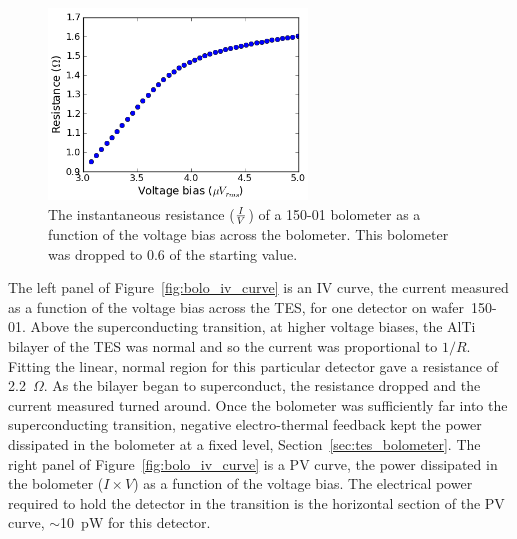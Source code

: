 \begin{figure}[htbp]
\begin{center}
\includegraphics[height=2in]{figures/b53w0c0_RV.png} 
\caption{The instantaneous resistance ($I \over V$) of a 150-01 bolometer as a function of the voltage bias across the bolometer. This bolometer was dropped to 0.6 of the starting value. 
\label{fig:bolo_rv_curve} }
\end{center}
\end{figure}


The left panel of Figure~\ref{fig:bolo_iv_curve} is an IV curve, the current measured as a function of the voltage bias across the \ac{TES}, for one detector on wafer~150-01.
Above the superconducting transition, at higher voltage biases, the AlTi bilayer of the \ac{TES} was normal and so the current was proportional to $1/R$. 
Fitting the linear, normal region for this particular detector gave a resistance of 2.2~$\Omega$.
As the bilayer began to superconduct, the resistance dropped and the current measured turned around. %
Once the bolometer was sufficiently far into the superconducting transition, negative electro-thermal feedback kept the power dissipated in the bolometer at a fixed level, Section~\ref{sec:tes_bolometer}.
The right panel of Figure~\ref{fig:bolo_iv_curve} is a PV curve, the power dissipated in the bolometer ($I \times V$) as a function of the voltage bias. 
The electrical power required to hold the detector in the transition is the horizontal section of the PV curve, $\sim$10~pW for this detector.

